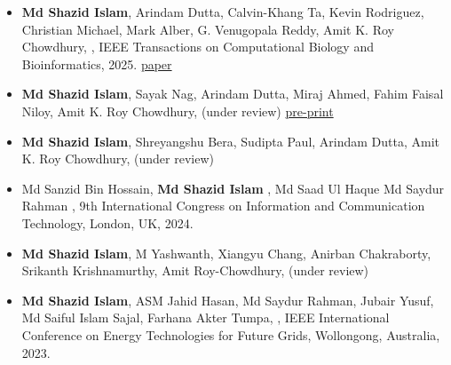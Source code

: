 \documentclass[a4paper,7 pt]{article}
\begin{document}
\begin{itemize}

\item \textbf{Md Shazid Islam}, Arindam Dutta, Calvin-Khang Ta, Kevin Rodriguez, Christian Michael, Mark Alber, G. Venugopala Reddy, Amit K. Roy Chowdhury, , IEEE Transactions on Computational Biology and Bioinformatics, 2025. \href{https://ieeexplore.ieee.org/abstract/document/10820545}{ paper}


\item \textbf{Md Shazid Islam}, Sayak Nag, Arindam Dutta, Miraj Ahmed, Fahim Faisal Niloy, Amit K. Roy Chowdhury,  (under review) \href{https://arxiv.org/abs/2312.05407}
{pre-print}

\item \textbf{Md Shazid Islam}, Shreyangshu Bera, Sudipta Paul, Arindam Dutta, Amit K. Roy Chowdhury,  (under review)


\item Md Sanzid Bin Hossain, \textbf{Md Shazid Islam} , Md Saad Ul Haque Md Saydur Rahman  , 9th International Congress on Information and Communication Technology, London, UK, 2024.

\item \textbf{Md Shazid Islam}, M Yashwanth, Xiangyu Chang, Anirban Chakraborty, Srikanth Krishnamurthy, Amit Roy-Chowdhury,  (under review)



\item \textbf{Md Shazid Islam}, ASM Jahid Hasan, Md Saydur Rahman, Jubair Yusuf, Md Saiful Islam Sajal, Farhana Akter Tumpa,  , IEEE International Conference on Energy Technologies for Future Grids, Wollongong, Australia, 2023.


\end{itemize}
\end{document}
